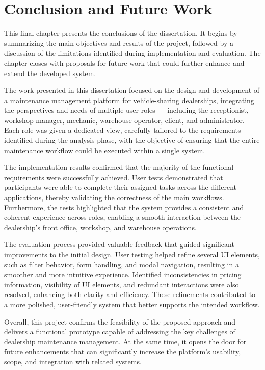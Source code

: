 \chapter{Conclusion and Future Work}%
\label{chapter:Conclusion and Future Work}

\begin{introduction}
This final chapter presents the conclusions of the dissertation. It begins by summarizing the main objectives and results of the project, followed by a discussion of the limitations identified during implementation and evaluation. The chapter closes with proposals for future work that could further enhance and extend the developed system.
\end{introduction} 

The work presented in this dissertation focused on the design and development of a maintenance management platform for vehicle-sharing dealerships, integrating the perspectives and needs of multiple user roles — including the receptionist, workshop manager, mechanic, warehouse operator, client, and administrator. Each role was given a dedicated view, carefully tailored to the requirements identified during the analysis phase, with the objective of ensuring that the entire maintenance workflow could be executed within a single system.

The implementation results confirmed that the majority of the functional requirements were successfully achieved. User tests demonstrated that participants were able to complete their assigned tasks across the different applications, thereby validating the correctness of the main workflows. Furthermore, the tests highlighted that the system provides a consistent and coherent experience across roles, enabling a smooth interaction between the dealership's front office, workshop, and warehouse operations.

The evaluation process provided valuable feedback that guided significant improvements to the initial design. User testing helped refine several \ac{UI} elements, such as filter behavior, form handling, and modal navigation, resulting in a smoother and more intuitive experience. Identified inconsistencies in pricing information, visibility of \ac{UI} elements, and redundant interactions were also resolved, enhancing both clarity and efficiency. These refinements contributed to a more polished, user-friendly system that better supports the intended workflow.

Overall, this project confirms the feasibility of the proposed approach and delivers a functional prototype capable of addressing the key challenges of dealership maintenance management. At the same time, it opens the door for future enhancements that can significantly increase the platform's usability, scope, and integration with related systems.

